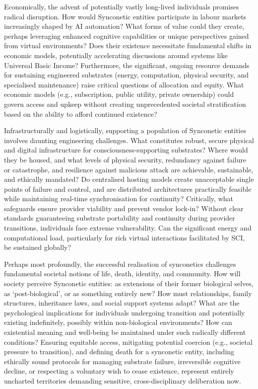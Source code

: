 \documentclass[10pt]{article}
\begin{document}
\begin{sloppypar}
  Economically, the advent of potentially vastly long-lived individuals promises radical disruption. How would Synconetic entities participate in labour markets increasingly shaped by AI automation? What forms of value could they create, perhaps leveraging enhanced cognitive capabilities or unique perspectives gained from virtual environments? Does their existence necessitate fundamental shifts in economic models, potentially accelerating discussions around systems like Universal Basic Income? Furthermore, the significant, ongoing resource demands for sustaining engineered substrates (energy, computation, physical security, and specialised maintenance) raise critical questions of allocation and equity. What economic models (e.g., subscription, public utility, private ownership) could govern access and upkeep without creating unprecedented societal stratification based on the ability to afford continued existence?

  Infrastructurally and logistically, supporting a population of Synconetic entities involves daunting engineering challenges. What constitutes robust, secure physical and digital infrastructure for consciousness-supporting substrates? Where would they be housed, and what levels of physical security, redundancy against failure or catastrophe, and resilience against malicious attack are achievable, sustainable, and ethically mandated? Do centralised hosting models create unacceptable single points of failure and control, and are distributed architectures practically feasible while maintaining real-time synchronisation for continuity? Critically, what safeguards ensure provider viability and prevent vendor lock-in? Without clear standards guaranteeing substrate portability and continuity during provider transitions, individuals face extreme vulnerability. Can the significant energy and computational load, particularly for rich virtual interactions facilitated by SCI, be sustained globally?

  Perhaps most profoundly, the successful realisation of synconetics challenges fundamental societal notions of life, death, identity, and community. How will society perceive Synconetic entities: as extensions of their former biological selves, as ‘post-biological’, or as something entirely new? How must relationships, family structures, inheritance laws, and social support systems adapt? What are the psychological implications for individuals undergoing transition and potentially existing indefinitely, possibly within non-biological environments? How can existential meaning and well-being be maintained under such radically different conditions? Ensuring equitable access, mitigating potential coercion (e.g., societal pressure to transition), and defining death for a synconetic entity, including ethically sound protocols for managing substrate failure, irreversible cognitive decline, or respecting a voluntary wish to cease existence, represent entirely uncharted territories demanding sensitive, cross-disciplinary deliberation now.


\end{sloppypar}
\end{document}
